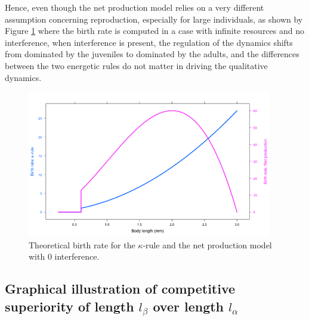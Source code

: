 Hence, even though the net production model relies on a very different
assumption concerning reproduction, especially for large individuals, as shown
by Figure \ref{Fig4-SM11} where the birth rate is computed in a case with
infinite resources and no interference, when interference is present, the regulation of
the dynamics shifts from dominated by the juveniles to dominated by the adults,
and the differences between the two energetic rules do not matter in driving the
qualitative dynamics.

\begin{figure}[!ht] %
\centering
\includegraphics[width=0.95\textwidth]{4_ChapThe1/Fig/FigSM11}
\caption[Theoretical birth rate for the $\kappa$-rule and the net production model with
$0$ interference]{
Theoretical birth rate for the $\kappa$-rule and the net production model with
$0$ interference.}
\label{Fig4-SM11}
\end{figure}

\subsection{Graphical illustration of competitive superiority of length
\texorpdfstring{$l_{\beta}$}{l_beta} over length
\texorpdfstring{$l_{\alpha}$}{l_alpha}}\label{subsec:SupMat5}

